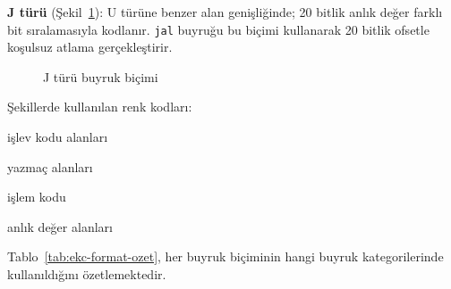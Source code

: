 \textbf{J türü} (Şekil~\ref{fig:ekc-j-tipi}): U türüne benzer alan genişliğinde; 20 bitlik anlık değer farklı bit sıralamasıyla kodlanır. \texttt{jal} buyruğu bu biçimi kullanarak 20 bitlik ofsetle koşulsuz atlama gerçekleştirir.

\begin{figure}[H]
\centering
{}
\caption{J türü buyruk biçimi}
\label{fig:ekc-j-tipi}
\end{figure}

\vspace{0.5em}
\noindent
Şekillerde kullanılan renk kodları:\\[3pt]
\colorbox{blokgri}{\small\strut işlev kodu alanları}\quad
\colorbox{blokmavi}{\small\strut yazmaç alanları}\quad
\colorbox{blokyesil}{\small\strut işlem kodu}\quad
\colorbox{bloksari}{\small\strut anlık değer alanları}

\vspace{1em}
Tablo~\ref{tab:ekc-format-ozet}, her buyruk biçiminin hangi buyruk kategorilerinde kullanıldığını özetlemektedir.

